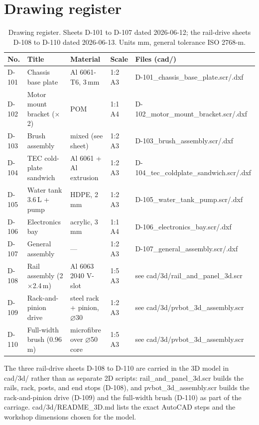 \documentclass[11pt,a4paper]{article}
\newcommand{\fpath}[1]{{\ttfamily\small #1}}
\begin{document}
\section{Drawing register}
\begin{table}[h]
\centering
\caption{Drawing register. Sheets D-101 to D-107 dated 2026-06-12; the
rail-drive sheets D-108 to D-110 dated 2026-06-13. Units mm, general
tolerance ISO 2768-m.}
\label{tab:register}
\small
\begin{tabular}{lllll}
\toprule
No. & Title & Material & Scale & Files (\fpath{cad/}) \\
\midrule
D-101 & Chassis base plate & Al 6061-T6, 3\,mm & 1:2 A3 &
  \fpath{D-101\_chassis\_base\_plate.scr/.dxf} \\
D-102 & Motor mount bracket ($\times$2) & POM & 1:1 A4 &
  \fpath{D-102\_motor\_mount\_bracket.scr/.dxf} \\
D-103 & Brush assembly & mixed (see sheet) & 1:2 A3 &
  \fpath{D-103\_brush\_assembly.scr/.dxf} \\
D-104 & TEC cold-plate sandwich & Al 6061 + Al extrusion & 1:2 A3 &
  \fpath{D-104\_tec\_coldplate\_sandwich.scr/.dxf} \\
D-105 & Water tank 3.6\,L + pump & HDPE, 2\,mm & 1:2 A3 &
  \fpath{D-105\_water\_tank\_pump.scr/.dxf} \\
D-106 & Electronics bay & acrylic, 3\,mm & 1:1 A4 &
  \fpath{D-106\_electronics\_bay.scr/.dxf} \\
D-107 & General assembly & --- & 1:2 A3 &
  \fpath{D-107\_general\_assembly.scr/.dxf} \\
\addlinespace
D-108 & Rail assembly (2$\times$2.4\,m) & Al 6063 2040 V-slot & 1:5 A3 &
  see \fpath{cad/3d/rail\_and\_panel\_3d.scr} \\
D-109 & Rack-and-pinion drive & steel rack + pinion, $\varnothing$30 & 1:2 A3 &
  see \fpath{cad/3d/pvbot\_3d\_assembly.scr} \\
D-110 & Full-width brush ($0.96$\,m) & microfibre over $\varnothing$50 core & 1:5 A3 &
  see \fpath{cad/3d/pvbot\_3d\_assembly.scr} \\
\bottomrule
\end{tabular}
\end{table}

The three rail-drive sheets D-108 to D-110 are carried in the 3D model in
\fpath{cad/3d/} rather than as separate 2D scripts: \fpath{rail\_and\_panel\_3d.scr}
builds the rails, rack, posts, and end stops (D-108), and
\fpath{pvbot\_3d\_assembly.scr} builds the rack-and-pinion drive (D-109) and the
full-width brush (D-110) as part of the carriage. \fpath{cad/3d/README\_3D.md}
lists the exact AutoCAD steps and the workshop dimensions chosen for the model.
\end{document}
